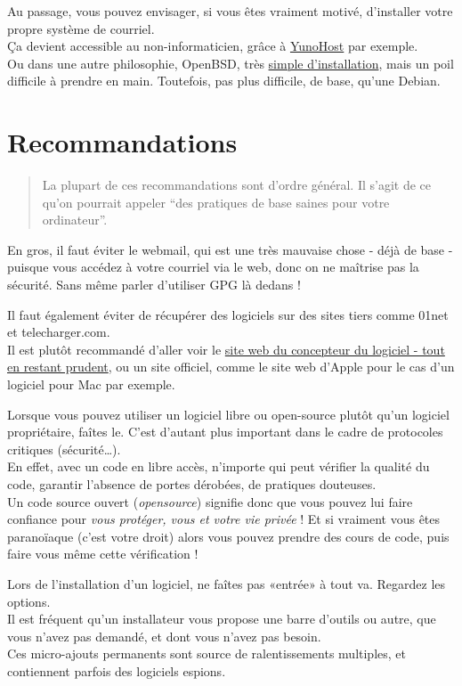 Au passage, vous pouvez envisager, si vous êtes vraiment motivé,
d'installer votre propre système de courriel.\\Ça devient accessible au
non-informaticien, grâce à \href{https://yunohost.org/}{YunoHost} par
exemple.\\Ou dans une autre philosophie, OpenBSD, très
\href{http://blog.chown.me/pourquoi-j-adore-openbsd.html}{simple
d'installation}, mais un poil difficile à prendre en main. Toutefois,
pas plus difficile, de base, qu'une Debian.

\section{Recommandations}\label{recommandations}

\begin{quote}
La plupart de ces recommandations sont d'ordre général. Il s'agit de ce
qu'on pourrait appeler ``des pratiques de base saines pour votre
ordinateur''.
\end{quote}

En gros, il faut éviter le webmail, qui est une très mauvaise chose -
déjà de base - puisque vous accédez à votre courriel via le web, donc on
ne maîtrise pas la sécurité. Sans même parler d'utiliser GPG là dedans !

Il faut également éviter de récupérer des logiciels sur des sites tiers
comme 01net et telecharger.com.\\Il est plutôt recommandé d'aller voir
le
\href{http://cyrille-borne.com/article398/le-site-de-confiance-c-est-termine}{site
web du concepteur du logiciel - tout en restant prudent}, ou un site
officiel, comme le site web d'Apple pour le cas d'un logiciel pour Mac
par exemple.

Lorsque vous pouvez utiliser un logiciel libre ou open-source plutôt
qu'un logiciel propriétaire, faîtes le. C'est d'autant plus important
dans le cadre de protocoles critiques (sécurité\ldots{}).\\En effet,
avec un code en libre accès, n'importe qui peut vérifier la qualité du
code, garantir l'absence de portes dérobées, de pratiques douteuses.\\Un
code source ouvert (\emph{opensource}) signifie donc que vous pouvez lui
faire confiance pour \emph{vous protéger, vous et votre vie privée} ! Et
si vraiment vous êtes paranoïaque (c'est votre droit) alors vous pouvez
prendre des cours de code, puis faire vous même cette vérification !

Lors de l'installation d'un logiciel, ne faîtes pas «entrée» à tout va.
Regardez les options.\\Il est fréquent qu'un installateur vous propose
une barre d'outils ou autre, que vous n'avez pas demandé, et dont vous
n'avez pas besoin.\\Ces micro-ajouts permanents sont source de
ralentissements multiples, et contiennent parfois des logiciels espions.

